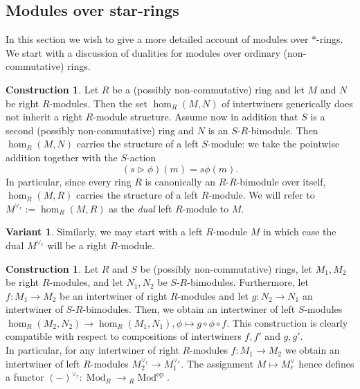 \documentclass{article}
\newcommand{\opp}{\operatorname{op}}%
\newcommand{\Mod}{\operatorname{Mod}}%
\numberwithin{equation}{section}
\theoremstyle{definition}
\newtheorem{construction}[definition]{Construction}
\newtheorem{variant}[definition]{Variant}
\theoremstyle{theorem}
\begin{document}
\subsection{Modules over star-rings}\label{Subsection: Modules over star-rings}
In this section we wish to give a more detailed account of modules over $*$-rings. We start with a discussion of dualities for modules over ordinary (non-commutative) rings.
\begin{construction}
    Let $R$ be a (possibly non-commutative) ring and let $M$ and $N$ be right $R$-modules. Then the set $\hom_{R}(M,N)$ of intertwiners generically does not 
    inherit a right $R$-module structure. Assume now in addition that $S$ is a second (possibly non-commutative) ring and $N$ is an $S$-$R$-bimodule. 
    Then $\hom_{R}(M,N)$ carries the structure of a left $S$-module: we take the pointwise addition together with the $S$-action 
    \begin{equation}
        (s \triangleright \phi)(m) = s \phi(m).
    \end{equation}
    In particular, since every ring $R$ is canonically an $R$-$R$-bimodule over itself, $\hom_{R}(M,R)$ carries the structure of a left $R$-module. 
    We will refer to $M^{\vee_r} := \hom_{R}(M,R)$ as the \emph{dual} left $R$-module to $M$. 
\end{construction}
\begin{variant}
    Similarly, we may start with a left $R$-module $M$ in which case the dual $M^{\vee_\ell}$ will be a right $R$-module. 
\end{variant}
\begin{construction}\label{Construction: dualization functor for non-commutative modules}
    Let $R$ and $S$ be (possibly non-commutative) rings, let $M_1,M_2$ be right $R$-modules, and let $N_1,N_2$ be $S$-$R$-bimodules. Furthermore, let 
    $f \colon M_1 \to M_2$ be an intertwiner of right $R$-modules and let $g \colon N_2 \to N_1$ an intertwiner of $S$-$R$-bimodules. Then, we obtain 
    an intertwiner of left $S$-modules $\hom_{R}(M_2,N_2) \to \hom_{R}(M_1,N_1), \phi \mapsto g \circ \phi \circ f$. This construction is clearly compatible 
    with respect to compositions of intertwiners $f,f'$ and $g,g'$. \\
    In particular, for any intertwiner of right $R$-modules $f \colon M_1 \to M_2$ we obtain an intertwiner of left $R$-modules $M_2^{\vee_r} \to M_1^{\vee_r}$. 
    The assignment $M \mapsto M^{\vee}_r$ hence defines a functor $(-)^{\vee_r} \colon \Mod_R \to {}_{R}\!\Mod^{\opp}$. 
\end{construction}
\end{document}
